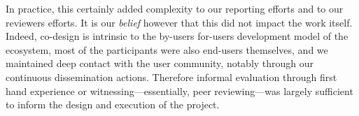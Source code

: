 In practice, this certainly added complexity to our reporting efforts
and to our reviewers efforts. It is our \emph{belief} however that
this did not impact the work itself. Indeed, co-design is intrinsic to
the by-users for-users development model of the ecosystem, most of the
participants were also end-users themselves, and we maintained deep
contact with the user community, notably through our continuous
dissemination actions. Therefore informal evaluation through first
hand experience or witnessing---essentially, peer reviewing---was largely sufficient to inform the
design and execution of the project.


